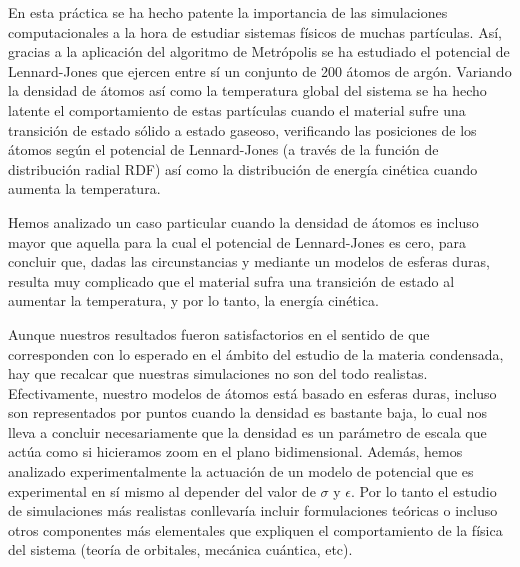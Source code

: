 En esta práctica se ha hecho patente la importancia de las simulaciones computacionales a la hora de estudiar sistemas físicos de muchas partículas. Así, gracias a la aplicación del algoritmo de Metrópolis se ha estudiado el potencial de Lennard-Jones que ejercen entre sí un conjunto de 200 átomos de argón. Variando la densidad de átomos así como la temperatura global del sistema se ha hecho latente el comportamiento de estas partículas cuando el material sufre una transición de estado sólido a estado gaseoso, verificando las posiciones de los átomos según el potencial de Lennard-Jones (a través de la función de distribución radial RDF) así como la distribución de energía cinética cuando aumenta la temperatura.

Hemos analizado un caso particular cuando la densidad de átomos es incluso mayor que aquella para la cual el potencial de Lennard-Jones es cero, para concluir que, dadas las circunstancias y mediante un modelos de esferas duras, resulta muy complicado que el material sufra una transición de estado al aumentar la temperatura, y por lo tanto, la energía cinética.

Aunque nuestros resultados fueron satisfactorios en el sentido de que corresponden con lo esperado en el ámbito del estudio de la materia condensada, hay que recalcar que nuestras simulaciones no son del todo realistas. Efectivamente, nuestro modelos de átomos está basado en esferas duras, incluso son representados por puntos cuando la densidad es bastante baja, lo cual nos lleva a concluir necesariamente que la densidad es un parámetro de escala que actúa como si hicieramos zoom en el plano bidimensional. Además, hemos analizado experimentalmente la actuación de un modelo de potencial que es experimental en sí mismo al depender del valor de $\sigma$ y $\epsilon$. Por lo tanto el estudio de simulaciones más realistas conllevaría incluir formulaciones teóricas o incluso otros componentes más elementales que expliquen el comportamiento de la física del sistema (teoría de orbitales, mecánica cuántica, etc).